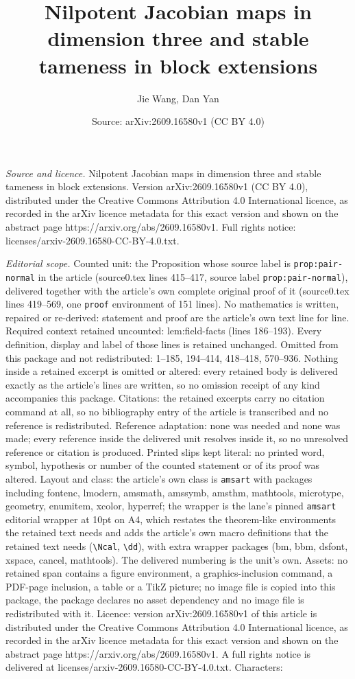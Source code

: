 \documentclass[10pt,a4paper]{amsart}
\title[Nilpotent Jacobian maps in dimension three and stable tamene]{Nilpotent Jacobian maps in dimension three and stable tameness in block extensions}
\author{Jie Wang, Dan Yan}
\date{Source: arXiv:2609.16580v1 (CC BY 4.0)}
\begin{document}
\maketitle

\noindent\emph{Source and licence.} Nilpotent Jacobian maps in dimension three and stable tameness in block extensions. Version arXiv:2609.16580v1 (CC BY 4.0), distributed under the Creative Commons Attribution 4.0 International licence, as recorded in the arXiv licence metadata for this exact version and shown on the abstract page https://arxiv.org/abs/2609.16580v1. Full rights notice: licenses/arxiv-2609.16580-CC-BY-4.0.txt.\par\smallskip

\noindent\textit{Editorial scope.} Counted unit: the Proposition whose source label is \texttt{prop:pair-normal} in the article (source0.tex lines 415--417, source label \texttt{prop:pair-normal}), delivered together with the article's own complete original proof of it (source0.tex lines 419--569, one \texttt{proof} environment of 151 lines). No mathematics is written, repaired or re-derived: statement and proof are the article's own text line for line. Required context retained uncounted: lem:field-facts (lines 186--193). Every definition, display and label of those lines is retained unchanged. Omitted from this package and not redistributed: 1--185, 194--414, 418--418, 570--936. Nothing inside a retained excerpt is omitted or altered: every retained body is delivered exactly as the article's lines are written, so no omission receipt of any kind accompanies this package. Citations: the retained excerpts carry no citation command at all, so no bibliography entry of the article is transcribed and no reference is redistributed. Reference adaptation: none was needed and none was made; every reference inside the delivered unit resolves inside it, so no unresolved reference or citation is produced. Printed slips kept literal: no printed word, symbol, hypothesis or number of the counted statement or of its proof was altered. Layout and class: the article's own class is \texttt{amsart} with packages including fontenc, lmodern, amsmath, amssymb, amsthm, mathtools, microtype, geometry, enumitem, xcolor, hyperref; the wrapper is the lane's pinned \texttt{amsart} editorial wrapper at 10pt on A4, which restates the theorem-like environments the retained text needs and adds the article's own macro definitions that the retained text needs (\texttt{\textbackslash Ncal}, \texttt{\textbackslash dd}), with extra wrapper packages (bm, bbm, dsfont, xspace, cancel, mathtools). The delivered numbering is the unit's own. Assets: no retained span contains a figure environment, a graphics-inclusion command, a PDF-page inclusion, a table or a TikZ picture; no image file is copied into this package, the package declares no asset dependency and no image file is redistributed with it. Licence: version arXiv:2609.16580v1 of this article is distributed under the Creative Commons Attribution 4.0 International licence, as recorded in the arXiv licence metadata for this exact version and shown on the abstract page https://arxiv.org/abs/2609.16580v1. A full rights notice is delivered at licenses/arxiv-2609.16580-CC-BY-4.0.txt. Characters: 
\end{document}
